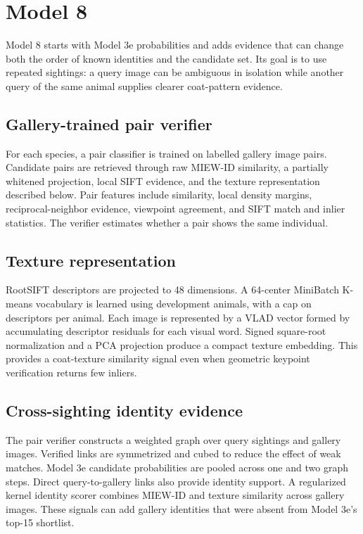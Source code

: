 \documentclass[11pt]{article}
\begin{document}
\section{Model 8}
Model 8 starts with Model 3e probabilities and adds evidence that can change both the order of known identities and the candidate set. Its goal is to use repeated sightings: a query image can be ambiguous in isolation while another query of the same animal supplies clearer coat-pattern evidence.

\subsection{Gallery-trained pair verifier}
For each species, a pair classifier is trained on labelled gallery image pairs. Candidate pairs are retrieved through raw MIEW-ID similarity, a partially whitened projection, local SIFT evidence, and the texture representation described below. Pair features include similarity, local density margins, reciprocal-neighbor evidence, viewpoint agreement, and SIFT match and inlier statistics. The verifier estimates whether a pair shows the same individual.

\subsection{Texture representation}
RootSIFT descriptors are projected to 48 dimensions. A 64-center MiniBatch K-means vocabulary is learned using development animals, with a cap on descriptors per animal. Each image is represented by a VLAD vector formed by accumulating descriptor residuals for each visual word. Signed square-root normalization and a PCA projection produce a compact texture embedding. This provides a coat-texture similarity signal even when geometric keypoint verification returns few inliers.

\subsection{Cross-sighting identity evidence}
The pair verifier constructs a weighted graph over query sightings and gallery images. Verified links are symmetrized and cubed to reduce the effect of weak matches. Model 3e candidate probabilities are pooled across one and two graph steps. Direct query-to-gallery links also provide identity support. A regularized kernel identity scorer combines MIEW-ID and texture similarity across gallery images. These signals can add gallery identities that were absent from Model 3e's top-15 shortlist.
\end{document}

